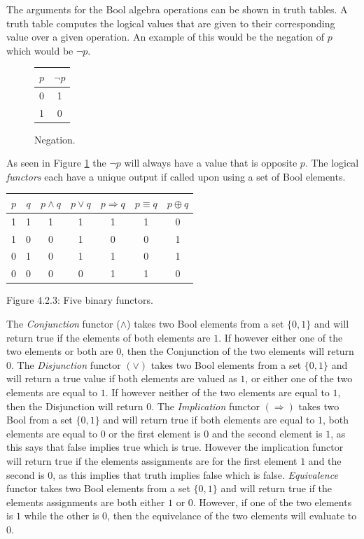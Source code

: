 \documentclass[11pt,a4paper]{report}
\begin{document}
The arguments for the Bool algebra operations can be shown in truth tables. A truth table computes the logical values that are given to their corresponding value over a given operation. An example of this would be the negation of $p$ which would be $\neg p$. 

\begin{figure}[H]
\centering
\label{tab:negation}
\begin{tabular}{|c|c|}
\hline
$p$ & $\neg p$\\ \hline
0 & 1 \\
1 & 0 \\ 
\hline
\end{tabular}  
\caption{Negation.}
\end{figure}

As seen in Figure \ref{tab:negation} the $\neg p$ will always have a value that is opposite $p$.
The logical \emph{functors} each have a unique output if called upon using a set of Bool elements.
\begin{center}
\begin{tabular}{|c|c||c|c|c|c|c|}
\hline
$p$ & $q$ & $p \land q$ & $p \lor q$ & $p \Rightarrow q$ & $p \equiv q$ & $p \oplus q$		\\ \hline
1 & 1 & 1 & 1 & 1 & 1 & 0\\
1 & 0 & 0 & 1 & 0 & 0 & 1\\
0 & 1 & 0 & 1 & 1 & 0 & 1\\
0 & 0 & 0 & 0 & 1 & 1 & 0\\
\hline
\end{tabular}  
\end{center}
\begin{center}
\label{Figure:4.2.3}{Figure 4.2.3: Five binary functors.}
\end{center}
The \emph{Conjunction} functor ($\land$) takes two Bool elements from a set $\{0,1\}$ and will return true if the elements of both elements are $1$. If however either one of the two elements or both are $0$, then the Conjunction of the two elements will return $0$. The \emph{Disjunction} functor $(\lor)$ takes two Bool elements from a set $\{0,1\}$ and will return a true value if both elements are valued as $1$, or either one of the two elements are equal to $1$. If however neither of the two elements are equal to $1$, then the Disjunction will return $0$. The \emph{Implication} functor $(\Rightarrow)$ takes two Bool from a set $\{0,1\}$ and will return true if both elements are equal to $1$, both elements are equal to $0$ or the first element is $0$ and the second element is $1$, as this says that false implies true which is true. However the implication functor will return true if the elements assignments are for the first element $1$ and the second is $0$, as this implies that truth implies false which is false. \emph{Equivalence} functor takes two Bool elements from a set $\{0,1\}$ and will return true if the elements assignments are both either $1$ or $0$. However, if one of the two elements is $1$ while the other is $0$, then the equivelance of the two elements will evaluate to $0$. 
\end{document}
